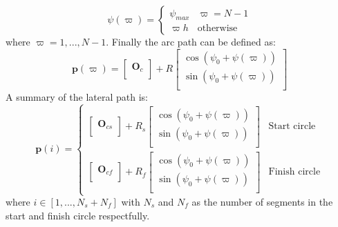\begin{equation}
\psi(\varpi) = \begin{cases}
\psi_{max} & \varpi = N-1 \\
\varpi h & \text{otherwise}
\end{cases}
\end{equation}
where $\varpi = 1,...,N-1$. Finally the arc path can be defined as:
\begin{equation}
\mathbf{p}(\varpi) = \begin{bmatrix}
\mathbf{O}_c \\
\end{bmatrix} + R\begin{bmatrix}
\cos(\psi_0 + \psi(\varpi)) \\
\sin(\psi_0 + \psi(\varpi)) \\
\end{bmatrix}
\end{equation}
A summary of the lateral path is:
\begin{equation}
\mathbf{p}(i) = \begin{cases}
\begin{bmatrix}
\mathbf{O}_{cs} \\
\end{bmatrix} + R_s\begin{bmatrix}
\cos(\psi_{0} + \psi(\varpi)) \\
\sin(\psi_{0} + \psi(\varpi)) \\
\end{bmatrix} & \text{Start circle} \\
\begin{bmatrix}
\mathbf{O}_{cf} \\
\end{bmatrix} + R_f\begin{bmatrix}
\cos(\psi_{0} + \psi(\varpi)) \\
\sin(\psi_{0} + \psi(\varpi)) \\
\end{bmatrix} & \text{Finish circle}
\end{cases}
\end{equation}
where $i \in [1,...,N_s + N_f]$ with $N_s$ and $N_f$ as the number of segments in the start and finish circle respectfully.
